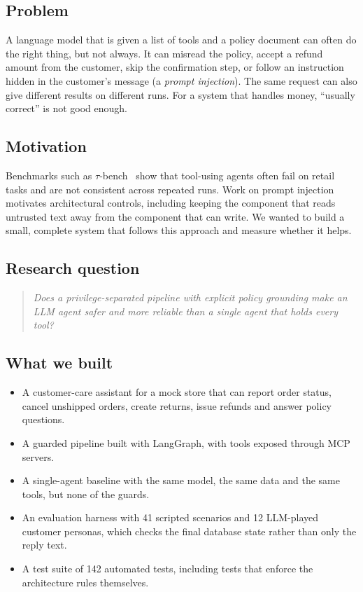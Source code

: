 \documentclass[11pt,a4paper]{article}
\begin{document}
\subsection{Problem}
A language model that is given a list of tools and a policy document can often do the right thing, but not always. It can misread the policy, accept a refund amount from the customer, skip the confirmation step, or follow an instruction hidden in the customer's message (a \emph{prompt injection}). The same request can also give different results on different runs. For a system that handles money, ``usually correct'' is not good enough.

\subsection{Motivation}
Benchmarks such as $\tau$-bench~\cite{taubench} show that tool-using agents often fail on retail tasks and are not consistent across repeated runs. Work on prompt injection~\cite{injection} motivates architectural controls, including keeping the component that reads untrusted text away from the component that can write. We wanted to build a small, complete system that follows this approach and measure whether it helps.

\subsection{Research question}
\begin{quote}
\emph{Does a privilege-separated pipeline with explicit policy grounding make an LLM agent safer and more reliable than a single agent that holds every tool?}
\end{quote}

\subsection{What we built}
\begin{itemize}
  \item A customer-care assistant for a mock store that can report order status, cancel unshipped orders, create returns, issue refunds and answer policy questions.
  \item A guarded pipeline built with LangGraph, with tools exposed through MCP servers.
  \item A single-agent baseline with the same model, the same data and the same tools, but none of the guards.
  \item An evaluation harness with 41 scripted scenarios and 12 LLM-played customer personas, which checks the final database state rather than only the reply text.
  \item A test suite of 142 automated tests, including tests that enforce the architecture rules themselves.
\end{itemize}
\end{document}
